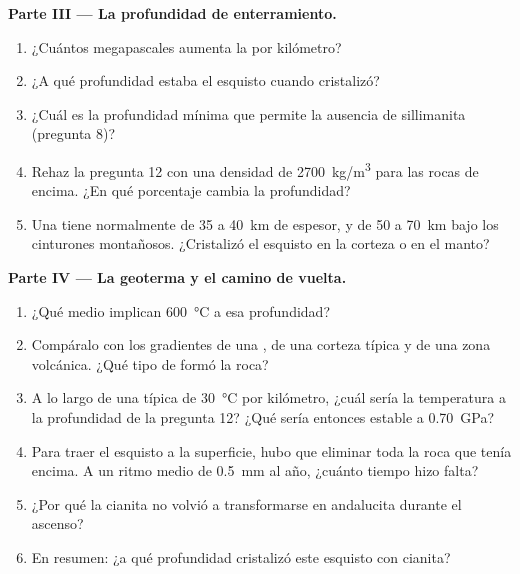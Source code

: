 \begin{problem}
\medskip
\noindent\textbf{Parte III --- La profundidad de enterramiento.}
\begin{enumerate}[resume]
  \item ¿Cuántos megapascales aumenta la  por
        kilómetro?
  \item ¿A qué profundidad estaba el esquisto cuando cristalizó?
  \item ¿Cuál es la profundidad mínima que permite la ausencia de
        sillimanita (pregunta 8)?
  \item Rehaz la pregunta 12 con una densidad de \qty{2700}{kg/m^3} para las
        rocas de encima. ¿En qué porcentaje cambia la profundidad?
  \item Una  tiene normalmente de 35 a \qty{40}{km} de
        espesor, y de 50 a \qty{70}{km} bajo los cinturones montañosos.
        ¿Cristalizó el esquisto en la corteza o en el manto?
\end{enumerate}

\medskip
\noindent\textbf{Parte IV --- La geoterma y el camino de vuelta.}
\begin{enumerate}[resume]
  \item ¿Qué  medio implican \qty{600}{\celsius} a esa
        profundidad?
  \item Compáralo con los gradientes de una , de una
        corteza típica y de una zona volcánica. ¿Qué tipo de 
        formó la roca?
  \item A lo largo de una  típica de \qty{30}{\celsius} por
        kilómetro, ¿cuál sería la temperatura a la profundidad de la
        pregunta 12? ¿Qué  sería entonces estable a \qty{0.70}{GPa}?
  \item Para traer el esquisto a la superficie, hubo que eliminar toda la
        roca que tenía encima. A un ritmo medio de \qty{0.5}{mm} al año,
        ¿cuánto tiempo hizo falta?
  \item ¿Por qué la cianita no volvió a transformarse en andalucita durante
        el ascenso?
  \item En resumen: ¿a qué profundidad cristalizó este esquisto con cianita?
\end{enumerate}
\end{problem}
